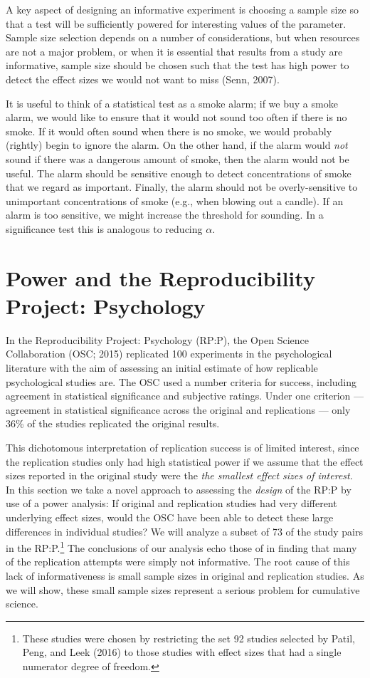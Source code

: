 \documentclass[doc,a4paper,floatsintext,draftfirst]{apa6}
\begin{document}
A key aspect of designing an informative experiment is choosing a sample size so that a test will be sufficiently powered for interesting values of the parameter. Sample size selection depends on a number of considerations, but when resources are not a major problem, or when it is essential that results from a study are informative, sample size should be chosen such that the test has high power to detect the effect sizes we would not want to miss (Senn, 2007). 

\nocite{Senn:2007}

It is useful to think of a statistical test as a smoke alarm; if we buy a smoke alarm, we would like to ensure that it would not sound too often if there is no smoke. If it would often sound when there is no smoke, we would probably (rightly) begin to ignore the alarm. On the other hand, if the alarm would {\em not} sound if there was a dangerous amount of smoke, then the alarm would not be useful. The alarm should be sensitive enough to detect concentrations of smoke that we regard as important. Finally, the alarm should not be overly-sensitive to unimportant concentrations of smoke (e.g., when blowing out a candle). If an alarm is too sensitive, we might increase the threshold for sounding. In a significance test this is analogous to reducing $\alpha$.

\section{Power and the Reproducibility Project: Psychology}

In the Reproducibility Project: Psychology (RP:P), the Open Science Collaboration (OSC; 2015) replicated 100 experiments in the psychological literature with the aim of assessing an initial estimate of how replicable psychological studies are. The OSC used a number criteria for success, including agreement in statistical significance and subjective ratings. Under one criterion --- agreement in statistical significance across the original and replications --- only 36\% of the studies replicated the original results. 

This dichotomous interpretation of replication success is of limited interest, since the replication studies only had high statistical power if we assume that the effect sizes reported in the original study were the {\em the smallest effect sizes of interest}. In this section we take a novel approach to assessing the {\em design} of the RP:P by use of a power analysis: If original and replication studies had very different underlying effect sizes, would the OSC have been able to detect these large differences in individual studies? We will analyze a subset of 73 of the study pairs in the RP:P.\footnote{These studies were chosen by restricting the set 92 studies selected by Patil, Peng, and Leek (2016) to those studies with effect sizes that had a single numerator degree of freedom.} The conclusions of our analysis echo those of \citet{Etz:Vandekerckhove:2016} in finding that many of the replication attempts were simply not informative. The root cause of this lack of informativeness is small sample sizes in original and replication studies. As we will show, these small sample sizes represent a serious problem for cumulative science.
\end{document}
